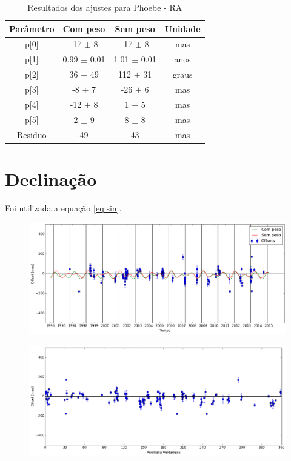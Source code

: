 \documentclass[11pt,a4paper]{report}
\begin{document}
\begin{table}[h!]
\caption{\label{Tab: Phoebe-RA} Resultados dos ajustes para Phoebe - RA}
\begin{centering}
\begin{tabular}{cccc}
\hline
\hline
Parâmetro & Com peso & Sem peso & Unidade\tabularnewline
\hline
p[0] & -17 $\pm$ 8 & -17 $\pm$ 8 & mas\\
p[1] & 0.99 $\pm$ 0.01 & 1.01 $\pm$ 0.01 & anos\\
p[2] & 36 $\pm$ 49 & 112 $\pm$ 31 & graus\\
p[3] & -8 $\pm$ 7 & -26 $\pm$ 6 & mas\\
p[4] & -12 $\pm$ 8 & 1 $\pm$ 5 & mas\\
p[5] & 2 $\pm$ 9 & 8 $\pm$ 8 & mas\\
Residuo & 49 & 43 & mas\\
\hline 
\end{tabular} 
\par\end{centering}
\end{table}

\section*{Declinação}

Foi utilizada a equação \ref{eq:sin}.

\begin{figure}[h]
\includegraphics[scale=0.45]{Phoebe/DEC.png} 
\end{figure}

\begin{figure}[h]
\includegraphics[scale=0.45]{Phoebe/DEC_anom.png}  
\end{figure}
\end{document}
